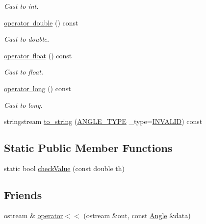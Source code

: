 \begin{DoxyCompactItemize}
\begin{DoxyCompactList}\small\item\em Cast to int. \end{DoxyCompactList}\item 
\mbox{\hyperlink{class_angle_a01eeceefbe7fc7172f7e4fbe17464e01}{operator double}} () const
\begin{DoxyCompactList}\small\item\em Cast to double. \end{DoxyCompactList}\item 
\mbox{\hyperlink{class_angle_a88d0ffaac106cff8233821b2f970b137}{operator float}} () const
\begin{DoxyCompactList}\small\item\em Cast to float. \end{DoxyCompactList}\item 
\mbox{\hyperlink{class_angle_a497355a5d68f92e7801ee4072e234185}{operator long}} () const
\begin{DoxyCompactList}\small\item\em Cast to long. \end{DoxyCompactList}\item 
stringstream \mbox{\hyperlink{class_angle_a5022b65b8a46e4050cde8a27cdc8d236}{to\+\_\+string}} (\mbox{\hyperlink{class_angle_a4f7b9849ce8780bcba95ca3ee45cff77}{A\+N\+G\+L\+E\+\_\+\+T\+Y\+PE}} \+\_\+type=\mbox{\hyperlink{class_angle_a4f7b9849ce8780bcba95ca3ee45cff77aa3c85e092f5da4bb998d0ddc6632dcbf}{I\+N\+V\+A\+L\+ID}}) const
\end{DoxyCompactItemize}
\subsection*{Static Public Member Functions}
\begin{DoxyCompactItemize}
\item 
static bool \mbox{\hyperlink{class_angle_a5a7714013699b70d5099bd40985288f1}{check\+Value}} (const double th)
\end{DoxyCompactItemize}
\subsection*{Friends}
\begin{DoxyCompactItemize}
\item 
ostream \& \mbox{\hyperlink{class_angle_a075a4a2521a314d707922253ebf03b4e}{operator$<$$<$}} (ostream \&out, const \mbox{\hyperlink{class_angle}{Angle}} \&data)
\end{DoxyCompactItemize}


